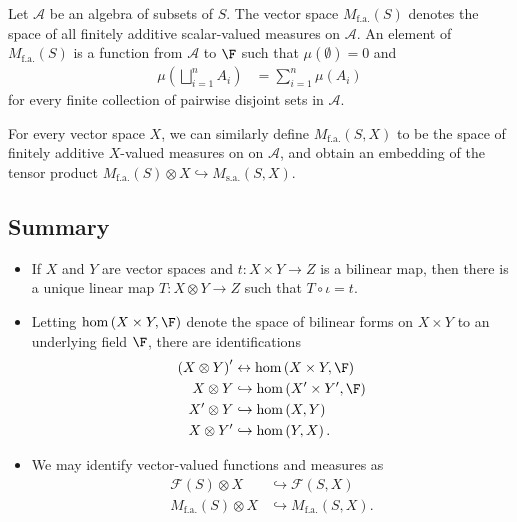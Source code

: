\documentclass[10pt]{mypackage}
\begin{document}
\begin{example}
  Let $\mathcal{A}$ be an algebra of subsets of $S$. The vector space $M_{\operatorname{f.a.}}\left( S \right)$ denotes the space of all finitely additive scalar-valued measures on $\mathcal{A}$. An element of $M_{\operatorname{f.a.}}(S)$ is a function from $\mathcal{A}$ to $\F$ such that $\mu(\emptyset) = 0$ and
  \begin{align*}
    \mu\left( \bigsqcup_{i=1}^{n}A_i \right) &= \sum_{i=1}^{n}\mu\left( A_i \right)
  \end{align*}
  for every finite collection of pairwise disjoint sets in $\mathcal{A}$.

  For every vector space $X$, we can similarly define $M_{\operatorname{f.a.}}(S,X)$ to be the space of finitely  additive $X$-valued measures on on $\mathcal{A}$, and obtain an embedding of the tensor product $M_{\operatorname{f.a.}}(S)\otimes X\hookrightarrow M_{\operatorname{s.a.}}(S,X)$.
\end{example}
\subsection{Summary}%
\begin{itemize}
  \item If $X$ and $Y$ are vector spaces and $t\colon X\times Y\rightarrow Z$ is a bilinear map, then there is a unique linear map $T\colon X\otimes Y\rightarrow Z$ such that $T\circ \iota = t$.
  \item Letting $\hom\left( X\times Y,\F \right)$ denote the space of bilinear forms on $X\times Y$ to an underlying field $\F$, there are identifications
    \begin{align*}
      \left( X\otimes Y \right)' &\leftrightarrow \hom\left( X\times Y,\F \right)\\
      X\otimes Y &\hookrightarrow \hom\left( X'\times Y',\F \right)\\
      X'\otimes Y &\hookrightarrow \hom\left( X,Y \right)\\
      X\otimes Y' &\hookrightarrow \hom\left( Y,X \right).
    \end{align*}
  \item We may identify vector-valued functions and measures as
    \begin{align*}
      \mathcal{F}(S)\otimes X &\hookrightarrow \mathcal{F}\left( S,X \right)\\
      M_{\operatorname{f.a.}}(S)\otimes X &\hookrightarrow M_{\operatorname{f.a.}}(S,X).
    \end{align*}
\end{itemize}
\end{document}
